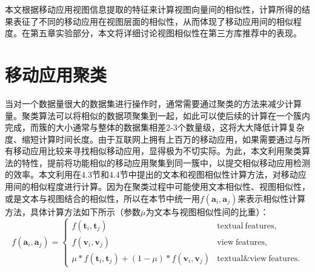 本文根据移动应用视图信息提取的特征来计算视图向量间的相似性，计算所得的结果表征了不同的移动应用在视图层面的相似性，从而体现了移动应用间的相似程度。在第五章实验部分，本文将详细讨论视图相似性在第三方库推荐中的表现。



\section{移动应用聚类}
当对一个数据量很大的数据集进行操作时，通常需要通过聚类的方法来减少计算量。聚类算法可以将相似的数据项聚集到一起，如此可以使后续的计算在一个簇内完成，而簇的大小通常与整体的数据集相差2-3个数量级，这将大大降低计算复杂度、缩短计算时间长度。由于互联网上拥有上百万的移动应用，如果需要通过与所有移动应用比较来寻找相似移动应用，显得极为不切实际。为此，本文利用聚类算法的特性，提前将功能相似的移动应用聚集到同一簇中，以提交相似移动应用检测的效率。本文利用在4.3节和4.4节中提出的文本和视图相似性计算方法，对移动应用间的相似程度进行计算。因为在聚类过程中可能使用文本相似性、视图相似性，或是文本与视图结合的相似性，所以在本节中统一用$f(\mathbf{a}_i, \mathbf{a}_j)$来表示相似性计算方法，具体计算方法如下所示（参数$\mu$为文本与视图相似性间的比重）：
\begin{equation}
f(\mathbf{a}_i, \mathbf{a}_j) =
\left\{\begin{matrix}
f(\mathbf{t}_i, \mathbf{t}_j) & \mathrm{textual \: features}, \\
f(\mathbf{v}_i, \mathbf{v}_j) & \mathrm{view \: features}, \\
\mu * f(\mathbf{t}_i, \mathbf{t}_j) + (1-\mu) * f(\mathbf{v}_i, \mathbf{v}_j) & \mathrm{textual \& view \: features}.
\end{matrix}\right.
\end{equation}


